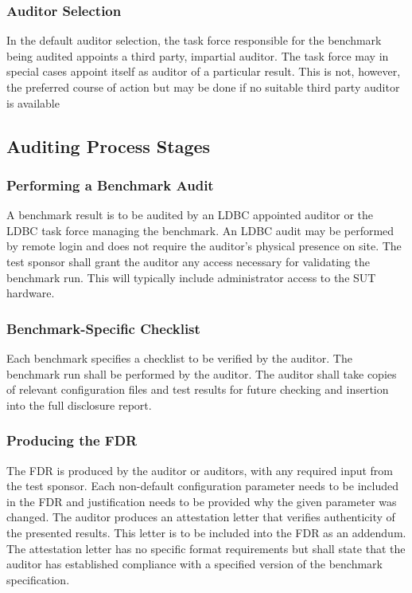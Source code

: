 \subsubsection{Auditor Selection}
In the default auditor selection, the task force responsible for the benchmark being audited appoints a third party, impartial auditor. The task force may in special cases appoint itself as auditor of a particular result. This is not, however, the preferred course of action but may be done if no suitable third party auditor is available


\subsection{Auditing Process Stages}
\subsubsection{Performing a Benchmark Audit}
A benchmark result is to be audited by an LDBC appointed auditor or the LDBC task force managing the benchmark. An LDBC audit may be performed by remote login and does not require the auditor's physical presence on site. The test sponsor shall grant the auditor any access necessary for validating the benchmark run. This will typically include administrator access to the SUT hardware.
    
\subsubsection{Benchmark-Specific Checklist}
Each benchmark specifies a checklist to be verified by the auditor. The benchmark run shall be performed by the auditor. The auditor shall take copies of relevant configuration files and test results for future checking and insertion into the full disclosure report.
    
\subsubsection{Producing the FDR}
The FDR is produced by the auditor or auditors, with any required input from the test sponsor. Each non-default configuration parameter needs to be included in the FDR and justification needs to be provided why the given parameter was changed.
The auditor produces an attestation letter that verifies authenticity of the presented results. This letter is to be included into the FDR as an addendum. The attestation letter has no specific format requirements but shall state that the auditor has established compliance with a specified version of the benchmark specification.

